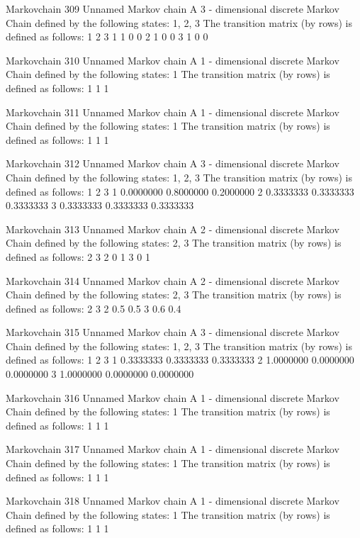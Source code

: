 \documentclass[
  nojss]{jss}
\begin{document}
\begin{CodeChunk}
\begin{CodeOutput}
Markovchain  309 
Unnamed Markov chain 
 A  3 - dimensional discrete Markov Chain defined by the following states: 
 1, 2, 3 
 The transition matrix  (by rows)  is defined as follows: 
  1 2 3
1 1 0 0
2 1 0 0
3 1 0 0

Markovchain  310 
Unnamed Markov chain 
 A  1 - dimensional discrete Markov Chain defined by the following states: 
 1 
 The transition matrix  (by rows)  is defined as follows: 
  1
1 1

Markovchain  311 
Unnamed Markov chain 
 A  1 - dimensional discrete Markov Chain defined by the following states: 
 1 
 The transition matrix  (by rows)  is defined as follows: 
  1
1 1

Markovchain  312 
Unnamed Markov chain 
 A  3 - dimensional discrete Markov Chain defined by the following states: 
 1, 2, 3 
 The transition matrix  (by rows)  is defined as follows: 
          1         2         3
1 0.0000000 0.8000000 0.2000000
2 0.3333333 0.3333333 0.3333333
3 0.3333333 0.3333333 0.3333333

Markovchain  313 
Unnamed Markov chain 
 A  2 - dimensional discrete Markov Chain defined by the following states: 
 2, 3 
 The transition matrix  (by rows)  is defined as follows: 
  2 3
2 0 1
3 0 1

Markovchain  314 
Unnamed Markov chain 
 A  2 - dimensional discrete Markov Chain defined by the following states: 
 2, 3 
 The transition matrix  (by rows)  is defined as follows: 
    2   3
2 0.5 0.5
3 0.6 0.4

Markovchain  315 
Unnamed Markov chain 
 A  3 - dimensional discrete Markov Chain defined by the following states: 
 1, 2, 3 
 The transition matrix  (by rows)  is defined as follows: 
          1         2         3
1 0.3333333 0.3333333 0.3333333
2 1.0000000 0.0000000 0.0000000
3 1.0000000 0.0000000 0.0000000

Markovchain  316 
Unnamed Markov chain 
 A  1 - dimensional discrete Markov Chain defined by the following states: 
 1 
 The transition matrix  (by rows)  is defined as follows: 
  1
1 1

Markovchain  317 
Unnamed Markov chain 
 A  1 - dimensional discrete Markov Chain defined by the following states: 
 1 
 The transition matrix  (by rows)  is defined as follows: 
  1
1 1

Markovchain  318 
Unnamed Markov chain 
 A  1 - dimensional discrete Markov Chain defined by the following states: 
 1 
 The transition matrix  (by rows)  is defined as follows: 
  1
1 1


\end{CodeOutput}
\end{CodeChunk}
\end{document}
